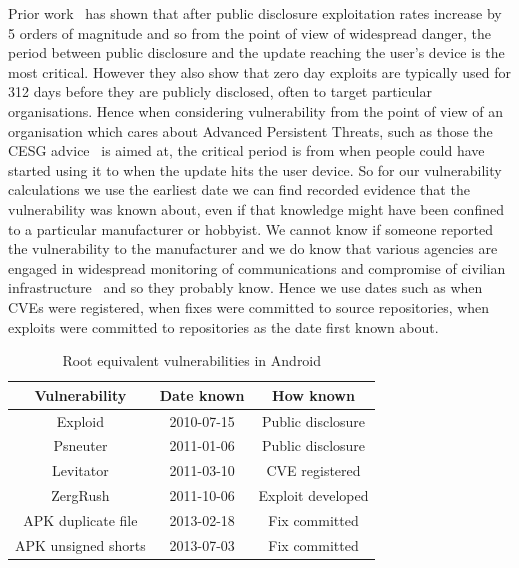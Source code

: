 \documentclass[conference,a4paper,twoside]{IEEEtran}
\begin{document}
Prior work~\cite{Bilge2012} has shown that after public disclosure exploitation rates increase by 5 orders of magnitude and so from the point of view of widespread danger, the period between public disclosure and the update reaching the user's device is the most critical.
However they also show that zero day exploits are typically used for 312 days before they are publicly disclosed, often to target particular organisations.
Hence when considering vulnerability from the point of view of an organisation which cares about Advanced Persistent Threats, such as those the CESG advice~\cite{CESG2013} is aimed at, the critical period is from when people could have started using it to when the update hits the user device.
So for our vulnerability calculations we use the earliest date we can find recorded evidence that the vulnerability was known about, even if that knowledge might have been confined to a particular manufacturer or hobbyist.
We cannot know if someone reported the vulnerability to the manufacturer and we do know that various agencies are engaged in widespread monitoring of communications and compromise of civilian infrastructure~\cite{TODO} and so they probably know.
Hence we use dates such as when CVEs were registered, when fixes were committed to source repositories, when exploits were committed to repositories as the date first known about.

\begin{table}
\centering
\begin{tabular}{c|c|c}
Vulnerability & Date known & How known \\
\hline
Exploid & 2010-07-15 & Public disclosure \\
Psneuter & 2011-01-06 & Public disclosure \\
Levitator & 2011-03-10 & CVE registered \\
ZergRush & 2011-10-06 & Exploit developed \\
APK duplicate file & 2013-02-18 & Fix committed \\
APK unsigned shorts & 2013-07-03 & Fix committed \\
\end{tabular}
\caption{Root equivalent vulnerabilities in Android}
\label{tab:andvulns}
\end{table}
\end{document}
